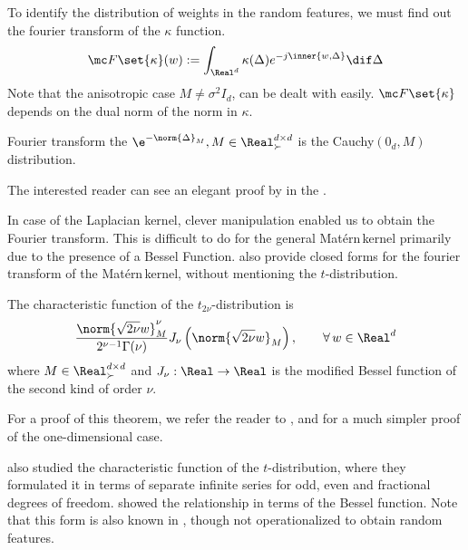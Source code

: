 \documentclass{article}
\def\matern{Mat\'ern\,}
\def\cite{\citep}
\theoremstyle{plain}
\begin{document}
To identify the distribution of weights in the random features, we must find out the fourier transform of the $\kappa$ function.
\begin{align*}
    \mc F\set{\kappa}(w):=\int_{\Real^d} \kappa(\Delta)e^{-j\inner{w,\Delta}}\dif\Delta
\end{align*}
Note that the anisotropic case $M\neq \sigma^2 I_d$, can be dealt with easily. $\mc F\set{\kappa}$ depends on the dual norm of the norm in $\kappa$.

\begin{lemma}\cite[Thm. 1.14]{Stein1971} 
\label{lemma:fourier_laplace}
    Fourier transform the $\e^{-\norm{\Delta}_M}, M\in\Real^{d\times d}_\succ$ is the \textsf{Cauchy}$(0_d, M)$ distribution.
    \end{lemma}
The interested reader can see an elegant proof by \cite{Stein1971} in the .

In case of the Laplacian kernel, clever manipulation enabled us to obtain the Fourier transform. This is difficult to do for the general \matern kernel primarily due to the presence of a Bessel Function. \cite{geom_random} also provide closed forms for the fourier transform of the \matern kernel, without mentioning the $t$-distribution.

\begin{proposition}\texorpdfstring{\cite[Thm. 3.1]{joarder1996characteristic}}{Thm 3.1 Joarder}\label{prop:fourier_t}
    The characteristic function of the $t_{2\nu}$-distribution is 
    \begin{align*}
        \frac{\norm{\sqrt{2\nu } w}_M^{\nu}}{2^{\nu-1}\Gamma(\nu)}J_{\nu}\left(\norm{\sqrt{2\nu } w}_M\right),\qquad\forall\,w\in\Real^d
    \end{align*}
where
$M\in\Real^{d\times d}_{\succ}$ and $ J_{\nu}:\Real\to\Real$ is the modified Bessel function of the second kind of order $\nu$.
\end{proposition}
For a proof of this theorem, we refer the reader to \cite{Kotz_Nadarajah_2004}, and \cite{characteristic_t} for a much simpler proof of the one-dimensional case.

\cite{sutradhar1986characteristic} also studied the characteristic function of the $t$-distribution, where they formulated it in terms of separate infinite series for odd, even and fractional degrees of freedom. \cite{joarder1996characteristic} showed the relationship in terms of the Bessel function. Note that this form is also known in \cite{geom_random}, though not operationalized to obtain random features.
\end{document}
